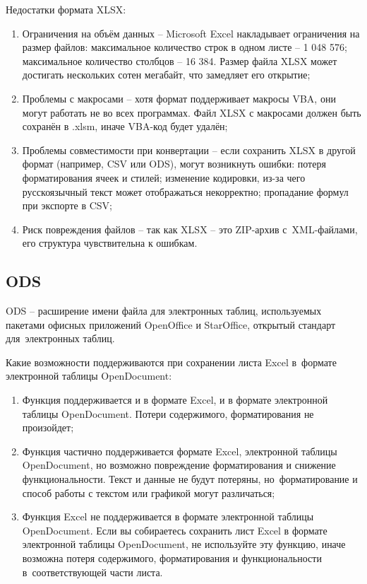 \documentclass{ou}
\begin{document}
Недостатки формата XLSX:
\begin{enumerate}[leftmargin=0em, itemindent=3.75em, nosep, label=\arabic*)]
\item Ограничения на объём данных -- Microsoft Excel накладывает ограничения на размер файлов: максимальное количество строк в одном листе -- 1 048 576; максимальное количество столбцов -- 16 384. Размер файла XLSX может достигать нескольких сотен мегабайт, что замедляет его открытие;
\item Проблемы с макросами -- хотя формат поддерживает макросы VBA, они могут работать не во всех программах. Файл XLSX с макросами должен быть сохранён в .xlsm, иначе VBA-код будет удалён;
\item Проблемы совместимости при конвертации -- если сохранить XLSX в другой формат (например, CSV или ODS), могут возникнуть ошибки: потеря форматирования ячеек и стилей; изменение кодировки, из-за чего русскоязычный текст может отображаться некорректно; пропадание формул при экспорте в CSV;
\item Риск повреждения файлов -- так как XLSX -- это ZIP-архив с~XML-файлами, его структура чувствительна к ошибкам. 
\end{enumerate}
\subsection{ODS}
ODS -- расширение имени файла для электронных таблиц, используемых пакетами офисных приложений OpenOffice и StarOffice, открытый стандарт для~электронных таблиц. 

Какие возможности поддерживаются при сохранении листа Excel в~формате электронной таблицы OpenDocument:
\begin{enumerate}[leftmargin=0em, itemindent=3.75em, nosep, label=\arabic*)]
\item Функция поддерживается и в формате Excel, и в формате электронной таблицы OpenDocument. Потери содержимого, форматирования не произойдет;
\item Функция частично поддерживается формате Excel, электронной таблицы OpenDocument, но возможно повреждение форматирования и снижение функциональности. Текст и данные не будут потеряны, но~форматирование и способ работы с текстом или графикой могут различаться;
\item Функция Excel не поддерживается в формате электронной таблицы OpenDocument. Если вы собираетесь сохранить лист Excel в формате электронной таблицы OpenDocument, не используйте эту функцию, иначе возможна потеря содержимого, форматирования и функциональности в~соответствующей части листа.
\end{enumerate}
\end{document}
